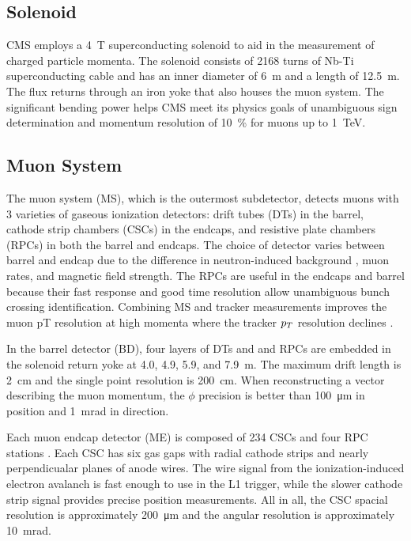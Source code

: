 \documentclass[12pt]{article}
\begin{document}
    \subsection{Solenoid}
        CMS employs a \SI{4}{T} superconducting solenoid to aid in the measurement of charged particle momenta. The solenoid consists of \num{2168} turns of Nb-Ti superconducting cable and has an inner diameter of \SI{6}{m} and a length of \SI{12.5}{m}. The flux returns through an iron yoke that also houses the muon system. The significant  bending power helps CMS meet its physics goals of unambiguous sign determination and momentum resolution of \SI{10}{\percent} for muons up to \SI{1}{\tera\electronvolt}.

    \subsection{Muon System}
        The muon system (MS), which is the outermost subdetector, detects muons with \num{3} varieties of gaseous ionization detectors: drift tubes (DTs) in the barrel, cathode strip chambers (CSCs) in the endcaps, and resistive plate chambers (RPCs) in both the barrel and endcaps. The choice of detector varies between barrel and endcap due to the difference in neutron-induced background , muon rates, and magnetic field strength. The RPCs are useful in the endcaps and barrel because their fast response and good time resolution allow unambiguous bunch crossing identification. Combining MS and tracker measurements improves the muon pT resolution at high momenta where the tracker $p_T$ resolution declines .

        In the barrel detector (BD), four layers of DTs and and RPCs are embedded in the solenoid return yoke at \num{4.0}, \num{4.9}, \num{5.9}, and \SI{7.9}{m}. The maximum drift length is \SI{2}{\cm} and the single point resolution is \SI{200}{\cm}. When reconstructing a vector describing the muon momentum, the $\phi$ precision is better than \SI{100}{\micro\m} in position and \SI{1}{\milli\radian} in direction. 

        Each muon endcap detector (ME) is composed of \num{234} CSCs and four RPC stations . Each CSC has six gas gaps with radial cathode strips and nearly perpendicualar planes of anode wires. The wire signal from the ionization-induced electron avalanch is fast enough to use in the L1 trigger, while the slower  cathode strip signal provides precise  position measurements. All in all, the CSC spacial resolution is approximately \SI{200}{\micro\m} and the angular resolution is approximately \SI{10}{\milli\radian}.
\end{document}
